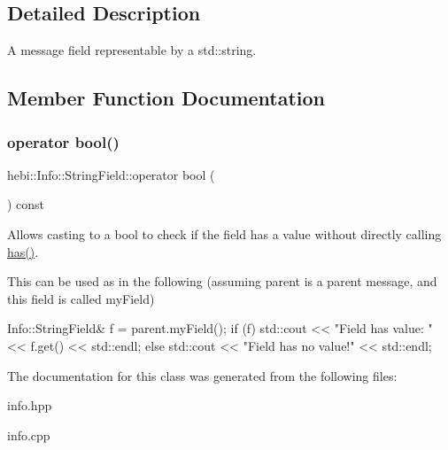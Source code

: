 \subsection{Detailed Description}
A message field representable by a std\+::string. 

\subsection{Member Function Documentation}
\mbox{\label{classhebi_1_1Info_1_1StringField_a822ffd7b474e7d8285c7cfe598532959}} 
\subsubsection{\texorpdfstring{operator bool()}{operator bool()}}
{\footnotesize\ttfamily hebi\+::\+Info\+::\+String\+Field\+::operator bool (\begin{DoxyParamCaption}{ }\end{DoxyParamCaption}) const\hspace{0.3cm}{\ttfamily [explicit]}}



Allows casting to a bool to check if the field has a value without directly calling {\ttfamily \hyperlink{classhebi_1_1Info_1_1StringField_a54e8e35c43471bc960a6796368d652e5}{has()}}. 

This can be used as in the following (assuming \textquotesingle{}parent\textquotesingle{} is a parent message, and this field is called \textquotesingle{}my\+Field\textquotesingle{}) 
\begin{DoxyCode}
Info::StringField& f = parent.myField();
\textcolor{keywordflow}{if} (f)
  std::cout << \textcolor{stringliteral}{"Field has value: "} << f.get() << std::endl;
\textcolor{keywordflow}{else}
  std::cout << \textcolor{stringliteral}{"Field has no value!"} << std::endl;
\end{DoxyCode}
 

The documentation for this class was generated from the following files\+:\begin{DoxyCompactItemize}
\item 
info.\+hpp\item 
info.\+cpp\end{DoxyCompactItemize}

